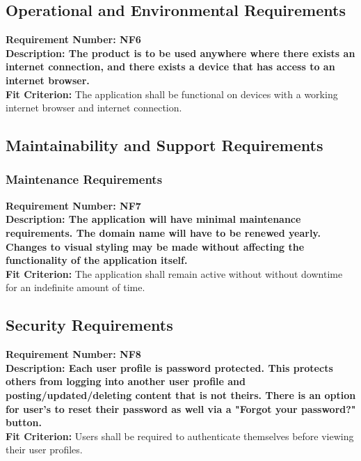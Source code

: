 \documentclass[12pt,fleqn]{article}
\begin{document}
\subsection {Operational and Environmental Requirements}
\begin{tcolorbox}
\textbf{Requirement Number: NF6} \\
\textbf{Description:
The product is to be used anywhere where there exists an internet connection, and there exists a device that has access to an internet browser.} \\
{\color{red} \textbf{Fit Criterion:} The application shall be functional on devices with a working internet browser and internet connection. }
\end{tcolorbox}
\subsection {Maintainability and Support Requirements}

\subsubsection{Maintenance Requirements}
\begin{tcolorbox}
\textbf{Requirement Number: NF7} \\
\textbf{Description:
The application will have minimal maintenance requirements. The domain name will have to be renewed yearly. Changes to visual styling may be made without affecting the functionality of the application itself.} \\
{\color{red} \textbf{Fit Criterion:} The application shall remain active without without downtime for an indefinite amount of time. }
\end{tcolorbox}

\subsection {Security Requirements}
\begin{tcolorbox}
\textbf{Requirement Number: NF8} \\
\textbf{Description:
Each user profile is password protected. This protects others from logging into another user profile and posting/updated/deleting content that is not theirs. There is an option for user's to reset their password as well via a "Forgot your password?" button.} \\
{\color{red} \textbf{Fit Criterion:} Users shall be required to authenticate themselves before viewing their user profiles. }
\end{tcolorbox}
\end{document}
